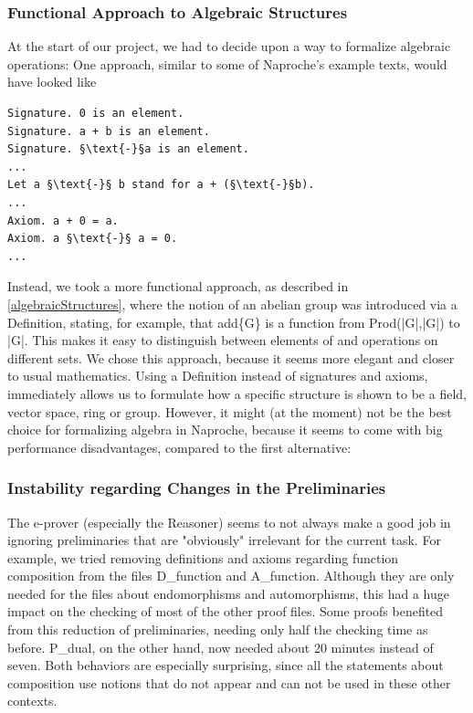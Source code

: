 \documentclass[11pt]{article}
\begin{document}
\subsubsection{Functional Approach to Algebraic Structures} \label{functionalapproach}
At the start of our project, we had to decide upon a way to formalize algebraic operations:
One approach, similar to some of Naproche's example texts, would have looked like
\begin{lstlisting}
Signature. 0 is an element.
Signature. a + b is an element.
Signature. §\text{-}§a is an element.
...
Let a §\text{-}§ b stand for a + (§\text{-}§b).
...
Axiom. a + 0 = a.
Axiom. a §\text{-}§ a = 0.
...
\end{lstlisting}

Instead, we took a more functional approach, as described in \ref{algebraicStructures}, where the notion of an abelian group was introduced via a {\ftl Definition}, stating, for example, that {\ftl add\{G\} is a function from Prod(|G|,|G|) to |G|}.
This makes it easy to distinguish between elements of and operations on different sets.
We chose this approach, because it seems more elegant and closer to usual mathematics. Using a {\ftl Definition} instead of signatures and axioms, immediately allows us to formulate how a specific structure is shown to be a field, vector space, ring or group.
However, it might (at the moment) not be the best choice for formalizing algebra in Naproche, because it seems to come with big performance disadvantages, compared to the first alternative:




\subsubsection{Instability regarding Changes in the Preliminaries} \label{instabilites}
The e-prover (especially the Reasoner) seems to not always make a good job in ignoring preliminaries that are "obviously" irrelevant for the current task.
For example, we tried removing definitions and axioms regarding function composition from the files D\_function and A\_function. Although they are only needed for the files about endomorphisms and automorphisms, this had a huge impact on the checking of most of the other proof files.
Some proofs benefited from this reduction of preliminaries, needing only half the checking time as before.
P\_dual, on the other hand, now needed about 20 minutes instead of seven.
Both behaviors are especially surprising, since all the statements about composition use notions that do not appear and can not be used in these other contexts.
\end{document}
